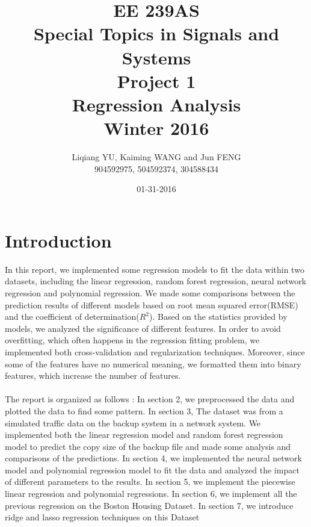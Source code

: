 \documentclass{article}
\begin{document}
\begin{titlepage}
\title{EE 239AS \\Special Topics in Signals and Systems\\Project 1\\Regression Analysis\\Winter 2016} 
\author{Liqiang YU, Kaiming WANG and Jun FENG\\
904592975, 504592374, 304588434} 
\date{01-31-2016}
\end{titlepage}

\maketitle
\newpage
\tableofcontents
\newpage
\section{Introduction}
In this report, we implemented some regression models to fit the data within two datasets, including the linear regression, random forest regression, neural network regression and polynomial regression. We made some comparisons between the prediction results of different models based on root mean squared error(RMSE) and the coefficient of determination($R^2$).
Based on the statistics provided by models, we analyzed the significance of different features. In order to avoid overfitting, which often happens in the regression fitting problem, we implemented both cross-validation and regularization techniques. Moreover, since some of the features have no numerical meaning, we formatted them into binary features, which increase the number of features. \\
\\
The report is organized as follows : In section 2, we preprocessed the data and plotted the data to find some pattern. In section 3, The dataset was from a simulated traffic data on the backup system in a network system. We implemented both the linear regression model and random forest regression model to predict the copy size of the backup file and made some analysis and comparisons of the predictions. In section 4, we implemented the neural network model and polynomial regression model to fit the data and analyzed the impact of different parameters to the results. In section 5, we implement the piecewise linear regression and polynomial regressions. In section 6, we implement all the previous regression on the Boston Housing Dataset. In section 7, we introduce ridge and lasso regression techniques on this Dataset 
\end{document}
